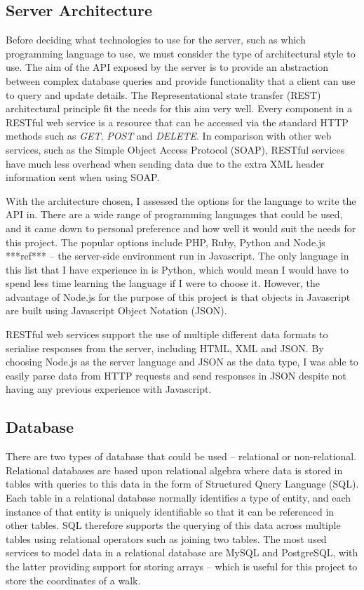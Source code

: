 
\subsection{Server Architecture} \label{subsection:server-architecture}

Before deciding what technologies to use for the server, such as which programming language to use, we must consider the type of architectural style to use. The aim of the API exposed by the server is to provide an abstraction between complex database queries and provide functionality that a client can use to query and update details. The Representational state transfer (REST) architectural principle fit the needs for this aim very well. Every component in a RESTful web service is a resource that can be accessed via the standard HTTP methods such as \textit{GET}, \textit{POST} and \textit{DELETE}. In comparison with other web services, such as the Simple Object Access Protocol (SOAP), RESTful services have much less overhead when sending data due to the extra XML header information sent when using SOAP.

With the architecture chosen, I assessed the options for the language to write the API in. There are a wide range of programming languages that could be used, and it came down to personal preference and how well it would suit the needs for this project. The popular options include PHP, Ruby, Python and Node.js ***ref*** -- the server-side environment run in Javascript. The only language in this list that I have experience in is Python, which would mean I would have to spend less time learning the language if I were to choose it. However, the advantage of Node.js for the purpose of this project is that objects in Javascript are built using Javascript Object Notation (JSON).

 RESTful web services support the use of multiple different data formats to serialise responses from the server, including HTML, XML and JSON. By choosing Node.js as the server language and JSON as the data type, I was able to easily parse data from HTTP requests and send responses in JSON despite not having any previous experience with Javascript.

\subsection{Database}

There are two types of database that could be used -- relational or non-relational. Relational databases are based upon relational algebra where data is stored in tables with queries to this data in the form of Structured Query Language (SQL). Each table in a relational database normally identifies a type of entity, and each instance of that entity is uniquely identifiable so that it can be referenced in other tables. SQL therefore supports the querying of this data across multiple tables using relational operators such as joining two tables. The most used services to model data in a relational database are MySQL and PostgreSQL, with the latter providing support for storing arrays -- which is useful for this project to store the coordinates of a walk.

